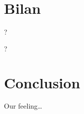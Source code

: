 \documentclass{beamer}
\begin{document}
\section{Bilan}

\begin{frame}
?
\end{frame}

\begin{frame}
?
\end{frame}

\section{Conclusion}
\begin{frame}
\begin{center}
\huge{Our feeling…}
\end{center}
\end{frame}

\end{document}
